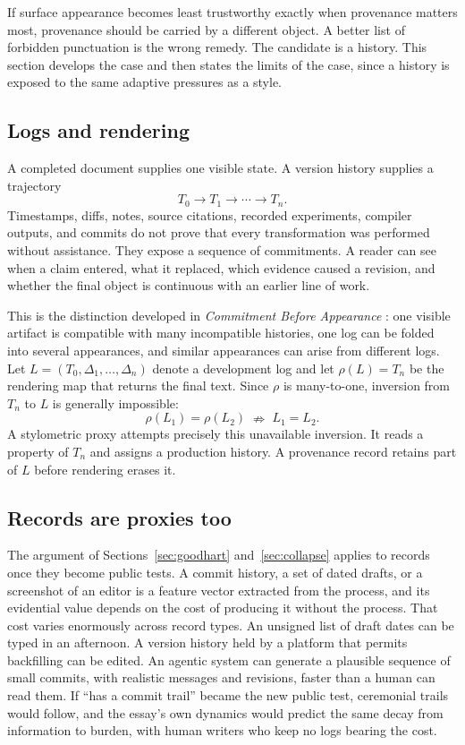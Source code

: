 \documentclass[11pt]{article}
\theoremstyle{plain}
\theoremstyle{definition}
\theoremstyle{remark}
\begin{document}
If surface appearance becomes least trustworthy exactly when provenance matters most, provenance should be carried by a different object. A better list of forbidden punctuation is the wrong remedy. The candidate is a history. This section develops the case and then states the limits of the case, since a history is exposed to the same adaptive pressures as a style.

\subsection{Logs and rendering}

A completed document supplies one visible state. A version history supplies a trajectory
\[
T_0 \rightarrow T_1 \rightarrow \cdots \rightarrow T_n.
\]
Timestamps, diffs, notes, source citations, recorded experiments, compiler outputs, and commits do not prove that every transformation was performed without assistance. They expose a sequence of commitments. A reader can see when a claim entered, what it replaced, which evidence caused a revision, and whether the final object is continuous with an earlier line of work.

This is the distinction developed in \emph{Commitment Before Appearance} \cite{flyxion2026}: one visible artifact is compatible with many incompatible histories, one log can be folded into several appearances, and similar appearances can arise from different logs. Let $L=(T_0,\Delta_1,\ldots,\Delta_n)$ denote a development log and let $\rho(L)=T_n$ be the rendering map that returns the final text. Since $\rho$ is many-to-one, inversion from $T_n$ to $L$ is generally impossible:
\[
\rho(L_1)=\rho(L_2)
\;\nRightarrow\;
L_1=L_2.
\]
A stylometric proxy attempts precisely this unavailable inversion. It reads a property of $T_n$ and assigns a production history. A provenance record retains part of $L$ before rendering erases it.

\subsection{Records are proxies too}

The argument of Sections~\ref{sec:goodhart} and~\ref{sec:collapse} applies to records once they become public tests. A commit history, a set of dated drafts, or a screenshot of an editor is a feature vector extracted from the process, and its evidential value depends on the cost of producing it without the process. That cost varies enormously across record types. An unsigned list of draft dates can be typed in an afternoon. A version history held by a platform that permits backfilling can be edited. An agentic system can generate a plausible sequence of small commits, with realistic messages and revisions, faster than a human can read them. If ``has a commit trail'' became the new public test, ceremonial trails would follow, and the essay's own dynamics would predict the same decay from information to burden, with human writers who keep no logs bearing the cost.
\end{document}
